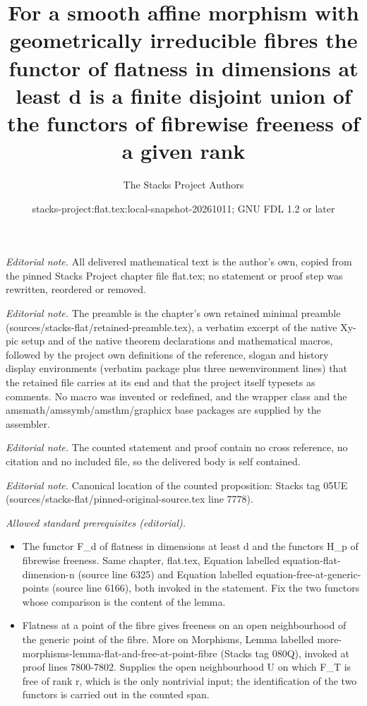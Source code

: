 \documentclass[10pt,a4paper]{amsart}
\title{For a smooth affine morphism with geometrically irreducible fibres the functor of flatness in dimensions at least d is a finite disjoint union of the functors of fibrewise freeness of a given rank}
\author{The Stacks Project Authors}
\date{stacks-project:flat.tex:local-snapshot-20261011; GNU FDL 1.2 or later}
\theoremstyle{plain}
\theoremstyle{definition}
\theoremstyle{remark}
\numberwithin{equation}{subsection}
\begin{document}
\maketitle
\noindent\textit{Editorial note.} All delivered mathematical text is the author's own, copied from the pinned Stacks Project chapter file flat.tex; no statement or proof step was rewritten, reordered or removed.\par\medskip
\noindent\textit{Editorial note.} The preamble is the chapter's own retained minimal preamble (sources/stacks-flat/retained-preamble.tex), a verbatim excerpt of the native Xy-pic setup and of the native theorem declarations and mathematical macros, followed by the project own definitions of the reference, slogan and history display environments (verbatim package plus three newenvironment lines) that the retained file carries at its end and that the project itself typesets as comments. No macro was invented or redefined, and the wrapper class and the amsmath/amssymb/amsthm/graphicx base packages are supplied by the assembler.\par\medskip
\noindent\textit{Editorial note.} The counted statement and proof contain no cross reference, no citation and no included file, so the delivered body is self contained.\par\medskip
\noindent\textit{Editorial note.} Canonical location of the counted proposition: Stacks tag 05UE (sources/stacks-flat/pinned-original-source.tex line 7778).\par\medskip
\noindent\textit{Allowed standard prerequisites (editorial).}\begin{itemize}
\item The functor F\_d of flatness in dimensions at least d and the functors H\_p of fibrewise freeness. Same chapter, flat.tex, Equation labelled equation-flat-dimension-n (source line 6325) and Equation labelled equation-free-at-generic-points (source line 6166), both invoked in the statement. Fix the two functors whose comparison is the content of the lemma.
\item Flatness at a point of the fibre gives freeness on an open neighbourhood of the generic point of the fibre. More on Morphisms, Lemma labelled more-morphisms-lemma-flat-and-free-at-point-fibre (Stacks tag 080Q), invoked at proof lines 7800-7802. Supplies the open neighbourhood U on which F\_T is free of rank r, which is the only nontrivial input; the identification of the two functors is carried out in the counted span.
\end{itemize}\medskip
\end{document}
